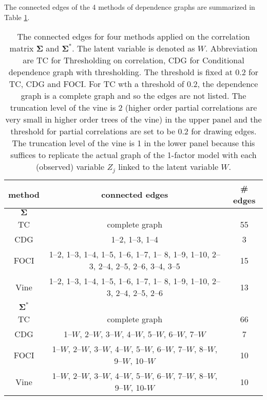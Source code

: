 \documentclass[a4paper]{article}
\def\sigb{{\boldsymbol{\Sigma}}}
\begin{document}
The connected edges of the 4 methods of dependence graphs are summarized in Table \ref{tab-example-edges}.
\begin{table}[H]
    \centering
    
    \begin{tabular}{c|c|c}
    \toprule
   method & connected edges & \# edges\\
   \hline
   $\sigb$ & &\\
   \hline
    TC   &  complete graph & 55\\
    \hline
    CDG   & 1--2, 1--3, 1--4 & 3\\
    \hline
    FOCI  & 1--2, 1--3, 1--4, 1--5, 1--6, 1--7, 1-- 8, 1--9, 1--10, 2--3, 2--4, 2--5, 2--6, 3--4, 3--5 & 15\\
    \hline
    Vine  & 1--2, 1--3, 1--4, 1--5, 1--6, 1--7, 1-- 8, 1--9, 1--10, 2--3, 2--4, 2--5, 2--6 &  13\\
   \midrule
    $\sigb^{*}$ & &\\
    \hline
    TC   &  complete graph & 66\\
    \hline
    CDG   & 1--$W$, 2--$W$, 3--$W$, 4--$W$, 5--$W$, 6--$W$, 7--$W$ & 7\\
    \hline
    FOCI  & 1--$W$, 2--$W$, 3--$W$, 4--$W$, 5--$W$, 6--$W$, 7--$W$, 8--$W$, 9--$W$, 10--$W$ & 10\\
    \hline
    Vine  &  1--$W$, 2--$W$, 3--$W$, 4--$W$, 5--$W$, 6--$W$, 7--$W$, 8--$W$, 9--$W$, 10-$W$ & 10\\
         \bottomrule
    \end{tabular}
    \caption{The connected edges for four methods applied on the correlation matrix $\sigb$ and $\sigb^{*}$. The latent variable is denoted as $W$. Abbreviation are TC for Thresholding on correlation, CDG for Conditional dependence graph with thresholding. The threshold is fixed at 0.2 for TC, CDG and FOCI. For TC wth a threshold of 0.2, the dependence graph is a complete graph and so the edges are not listed. The truncation level of the vine is 2 (higher order partial correlations are very small in higher order trees of the vine) in the upper panel and the threshold for partial correlations are set to be 0.2 for drawing edges. The truncation level of the vine is 1 in the lower panel because this suffices to replicate the actual graph of the 1-factor model with each (observed) variable $Z_j$ linked to the latent variable $W$.}
    \label{tab-example-edges}
\end{table}
\end{document}
